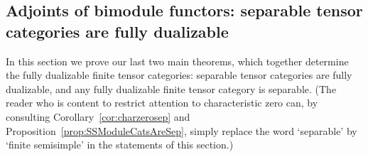 \documentclass{amsart}
\begin{document}





\subsection{Adjoints of bimodule functors: separable tensor categories are fully dualizable} \label{sec:separableisfd}


In this section we prove our last two main theorems, which together determine the fully dualizable finite tensor categories: separable tensor categories are fully dualizable, and any fully dualizable finite tensor category is separable.  (The reader who is content to restrict attention to characteristic zero can, by consulting Corollary~\ref{cor:charzerosep} and Proposition~\ref{prop:SSModuleCatsAreSep}, simply replace the word `separable' by `finite semisimple' in the statements of this section.)
\end{document}
